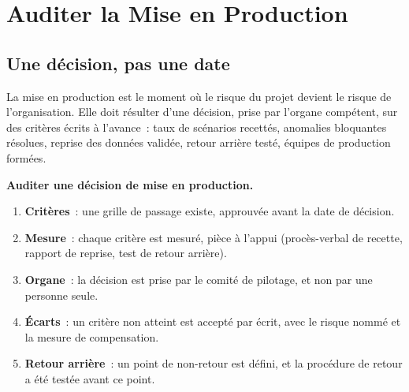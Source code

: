 \section{Auditer la Mise en Production}
\label{sec:c15-production}

\subsection{Une décision, pas une date}

La mise en production est le moment où le risque du projet devient le
risque de l'organisation. Elle doit résulter d'une décision, prise par
l'organe compétent, sur des critères écrits à l'avance~: taux de scénarios
recettés, anomalies bloquantes résolues, reprise des données validée,
retour arrière testé, équipes de production formées.

\begin{boxprocedure}
\textbf{Auditer une décision de mise en production.}
\begin{enumerate}
    \item \textbf{Critères}~: une grille de passage existe, approuvée avant
          la date de décision.
    \item \textbf{Mesure}~: chaque critère est mesuré, pièce à l'appui
          (procès-verbal de recette, rapport de reprise, test de retour
          arrière).
    \item \textbf{Organe}~: la décision est prise par le comité de pilotage,
          et non par une personne seule.
    \item \textbf{Écarts}~: un critère non atteint est accepté par écrit,
          avec le risque nommé et la mesure de compensation.
    \item \textbf{Retour arrière}~: un point de non-retour est défini, et la
          procédure de retour a été testée avant ce point.
\end{enumerate}
\end{boxprocedure}

